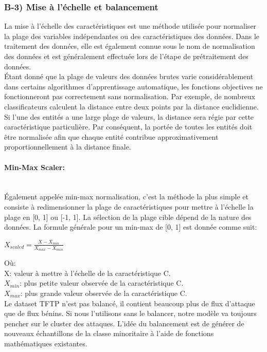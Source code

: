 \subsubsection{B-3) Mise à l'échelle et balancement}
La mise à l'échelle des caractéristiques est une méthode utilisée pour normaliser la plage des variables indépendantes ou des caractéristiques des données. Dans le traitement des données, elle est également connue sous le nom de normalisation des données et est généralement effectuée lors de l'étape de prétraitement des données.\\

\noindent Étant donné que la plage de valeurs des données brutes varie considérablement dans certains algorithmes d'apprentissage automatique, les fonctions objectives ne fonctionneront pas correctement sans normalisation. Par exemple, de nombreux classificateurs calculent la distance entre deux points par la distance euclidienne. Si l'une des entités a une large plage de valeurs, la distance sera régie par cette caractéristique particulière. Par conséquent, la portée de toutes les entités doit être normalisée afin que chaque entité contribue approximativement proportionnellement à la distance finale.

\paragraph{Min-Max Scaler: \\\\}
Également appelée min-max normalisation, c'est la méthode la plus simple et consiste à redimensionner la plage de caractéristiques pour mettre à l'échelle la plage en [0, 1] ou [-1, 1]. La sélection de la plage cible dépend de la nature des données. La formule générale pour un min-max de [0, 1] est donnée comme suit:
\begin{center}
{\large $ X_{scaled} = \frac{X - X_{min}}{X_{max} - X_{min}} $}
\end{center}
Où:\\

\indent X: valeur à mettre à l'échelle de la caractéristique C.\\
\indent $X_{min}$: plus petite valeur observée de la caractéristique C.\\
\indent $X_{max}$: plus grande valeur observée de la caractéristique C.\\

Le dataset TFTP n'est pas balancé, il contient beaucoup plus de flux d'attaque que de flux bénins. Si nous l'utilisons sans le balancer, notre modèle va toujours pencher sur le cluster des attaques. L'idée du balancement est de générer de nouveaux échantillons de la classe minoritaire à l'aide de fonctions mathématiques existantes.

